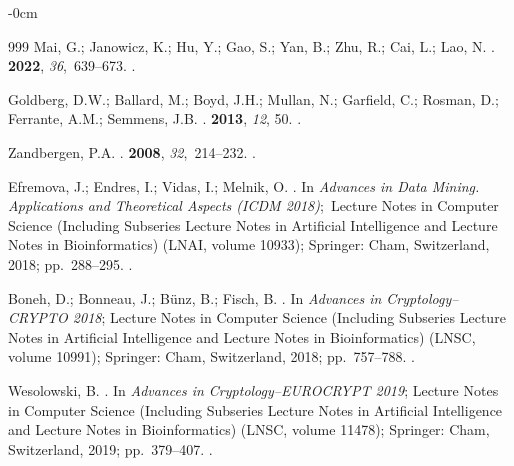 \documentclass[mathematics,article,accept,pdftex,moreauthors]{Definitions/mdpi}
\begin{document}
\begin{adjustwidth}{-\extralength}{0cm}
\begin{thebibliography}{999}
Mai, G.; Janowicz, K.; Hu, Y.; Gao, S.; Yan, B.; Zhu, R.; Cai, L.; Lao, N.
.
 {\bf
  2022}, {\em 36},~639--673.
.

Goldberg, D.W.; Ballard, M.; Boyd, J.H.; Mullan, N.; Garfield, C.; Rosman, D.;
  Ferrante, A.M.; Semmens, J.B.
.
 {\bf 2013}, {\em
  12}, 50.
.

Zandbergen, P.A.
.
 {\bf 2008}, {\em
  32},~214--232.
.

Efremova, J.; Endres, I.; Vidas, I.; Melnik, O.
.
\newblock In \emph{Advances in Data Mining. Applications and Theoretical Aspects
(ICDM 2018)};~{Lecture Notes in Computer Science (Including Subseries Lecture
  Notes in Artificial Intelligence and Lecture Notes in Bioinformatics)} (LNAI, volume 10933); Springer: Cham, Switzerland, 2018; pp.~288--295.
.

Boneh, D.; Bonneau, J.; B{\"{u}}nz, B.; Fisch, B.
.
\newblock In \emph{Advances in Cryptology--CRYPTO 2018}; {Lecture Notes in Computer Science (Including Subseries Lecture
  Notes in Artificial Intelligence and Lecture Notes in Bioinformatics)} (LNSC, volume 10991); Springer: Cham, Switzerland, 2018; pp.~757--788.
.

Wesolowski, B.
.
\newblock In \emph{Advances in Cryptology--EUROCRYPT 2019}; {Lecture Notes in Computer Science (Including Subseries Lecture
  Notes in Artificial Intelligence and Lecture Notes in Bioinformatics)} (LNSC, volume 11478); Springer: Cham, Switzerland, 2019; pp.~379--407.
.




\end{thebibliography}
\end{adjustwidth}
\end{document}
